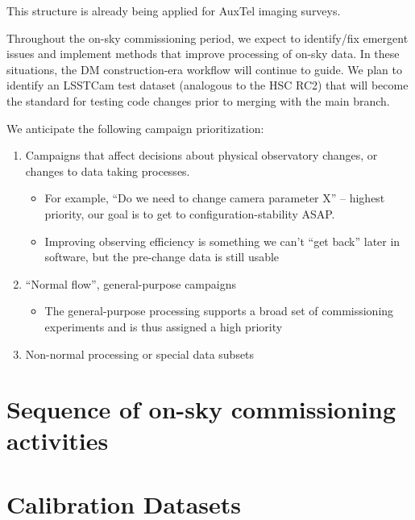 \documentclass[SE,authoryear,toc,lsstdraft]{lsstdoc}
\begin{document}
This structure is already being applied for AuxTel imaging surveys.

Throughout the on-sky commissioning period, we expect to identify/fix emergent issues and implement methods that improve processing of on-sky data.
In these situations, the DM construction-era workflow will continue to guide.
We plan to identify an LSSTCam test dataset (analogous to the HSC RC2) that will become the standard for testing
code changes prior to merging with the main branch.

We anticipate the following campaign prioritization:

\begin{enumerate}

  \item Campaigns that affect decisions about physical observatory changes, or changes to data taking processes.

  \begin{itemize}

    \item  For example, ``Do we need to change camera parameter X'' -- highest priority, our goal is to get to configuration-stability ASAP.

    \item Improving observing efficiency is something we can't ``get back'' later in software, but the pre-change data is still usable

  \end{itemize}

  \item ``Normal flow'', general-purpose campaigns

  \begin{itemize}

    \item The general-purpose processing supports a broad set of commissioning experiments and is thus assigned a high priority

  \end{itemize}

  \item Non-normal processing or special data subsets

\end{enumerate}

\section{Sequence of on-sky commissioning activities}

\section{Calibration Datasets}
\end{document}

